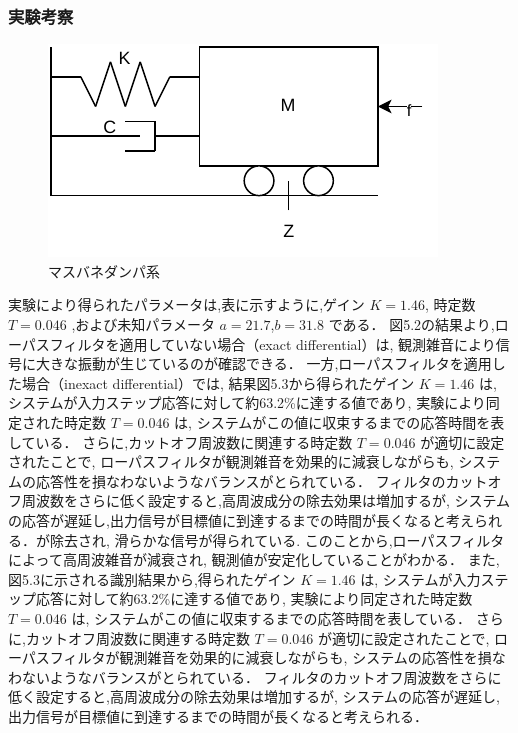 \newpage

\subsubsection{実験考察}
\begin{figure}[h]
  \centering
  \includegraphics[scale=1]{sozai/6.pdf}
  \caption{マスバネダンパ系}
\end{figure}

実験により得られたパラメータは,表に示すように,ゲイン \( K = 1.46 \),
時定数 \( T = 0.046 \) ,および未知パラメータ \( a = 21.7 \),\( b = 31.8 \) である．
図5.2の結果より,ローパスフィルタを適用していない場合（exact differential）は,
観測雑音により信号に大きな振動が生じているのが確認できる．
一方,ローパスフィルタを適用した場合（inexact differential）では,
結果図5.3から得られたゲイン \( K = 1.46 \) は,
システムが入力ステップ応答に対して約63.2\%に達する値であり,
実験により同定された時定数 \( T = 0.046 \) は,
システムがこの値に収束するまでの応答時間を表している．
さらに,カットオフ周波数に関連する時定数 \( T = 0.046 \) が適切に設定されたことで,
ローパスフィルタが観測雑音を効果的に減衰しながらも,
システムの応答性を損なわないようなバランスがとられている．
フィルタのカットオフ周波数をさらに低く設定すると,高周波成分の除去効果は増加するが,
システムの応答が遅延し,出力信号が目標値に到達するまでの時間が長くなると考えられる．が除去され,
滑らかな信号が得られている.
このことから,ローパスフィルタによって高周波雑音が減衰され,
観測値が安定化していることがわかる．
また,図5.3に示される識別結果から,得られたゲイン \( K = 1.46 \) は,
システムが入力ステップ応答に対して約63.2\%に達する値であり,
実験により同定された時定数 \( T = 0.046 \) は,
システムがこの値に収束するまでの応答時間を表している．
さらに,カットオフ周波数に関連する時定数 \( T = 0.046 \) が適切に設定されたことで,
ローパスフィルタが観測雑音を効果的に減衰しながらも,
システムの応答性を損なわないようなバランスがとられている．
フィルタのカットオフ周波数をさらに低く設定すると,高周波成分の除去効果は増加するが,
システムの応答が遅延し,出力信号が目標値に到達するまでの時間が長くなると考えられる．


